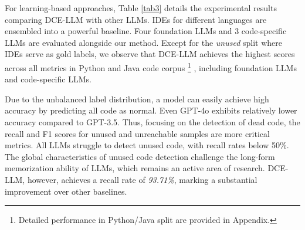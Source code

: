 \documentclass[11pt]{article}
\begin{document}

For learning-based approaches, Table \ref{tab3} details the experimental results comparing DCE-LLM with other LLMs. IDEs for different languages are ensembled into a powerful baseline. Four foundation LLMs and 3 code-specific LLMs are evaluated alongside our method. Except for the \textit{unused} split where IDEs serve as gold labels, we observe that DCE-LLM achieves the highest scores across all metrics in Python and Java code corpus
\footnote{Detailed performance in Python/Java split are provided in Appendix.}
, including foundation LLMs and code-specific LLMs.

Due to the unbalanced label distribution, a model can easily achieve high accuracy by predicting all code as normal. Even GPT-4o exhibits relatively lower accuracy compared to GPT-3.5. Thus, focusing on the detection of dead code, the recall and F1 scores for unused and unreachable samples are more critical metrics. All LLMs struggle to detect unused code, with recall rates below 50\%. The global characteristics of unused code detection challenge the long-form memorization ability of LLMs, which remains an active area of research. DCE-LLM, however, achieves a recall rate of \textit{93.71\%}, marking a substantial improvement over other baselines.
\end{document}
